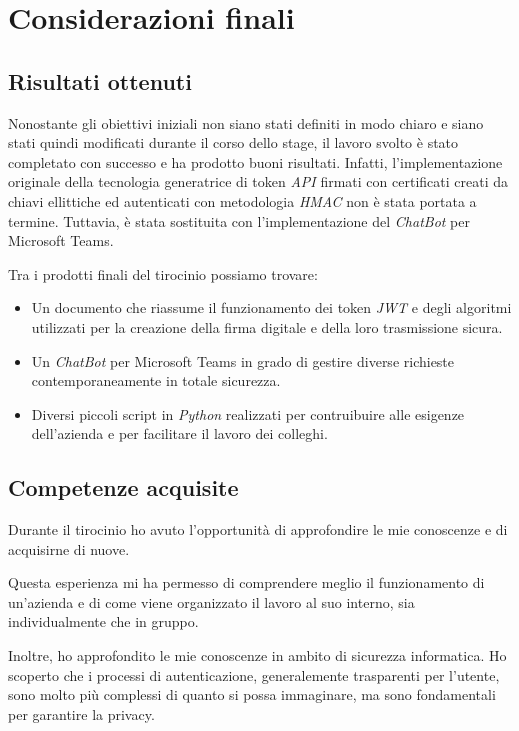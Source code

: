 \chapter{Considerazioni finali}
\label{cap:conclusioni}

\section{Risultati ottenuti}

Nonostante gli obiettivi iniziali non siano stati definiti in modo chiaro e siano stati quindi modificati durante il corso dello stage, il lavoro svolto è stato completato con successo e ha prodotto buoni risultati.
Infatti, l'implementazione originale della tecnologia generatrice di token \emph{API} firmati con certificati creati da chiavi ellittiche ed autenticati con metodologia \emph{HMAC} non è stata portata a termine.
Tuttavia, è stata sostituita con l'implementazione del \emph{ChatBot} per Microsoft Teams.

\noindent Tra i prodotti finali del tirocinio possiamo trovare:
\begin{itemize}
	\item Un documento che riassume il funzionamento dei token \emph{JWT} e degli algoritmi utilizzati per la creazione della firma digitale e della loro trasmissione sicura.
	\item Un \emph{ChatBot} per Microsoft Teams in grado di gestire diverse richieste contemporaneamente in totale sicurezza.
	\item Diversi piccoli script in \emph{Python} realizzati per contruibuire alle esigenze dell'azienda e per facilitare il lavoro dei colleghi.
\end{itemize}

\section{Competenze acquisite}

Durante il tirocinio ho avuto l'opportunità di approfondire le mie conoscenze e di acquisirne di nuove.

Questa esperienza mi ha permesso di comprendere meglio il funzionamento di un'azienda e di come viene organizzato il lavoro al suo interno, sia individualmente che in gruppo.

Inoltre, ho approfondito le mie conoscenze in ambito di sicurezza informatica.
Ho scoperto che i processi di autenticazione, generalemente trasparenti per l'utente, sono molto più complessi di quanto si possa immaginare, ma sono fondamentali per garantire la privacy.


